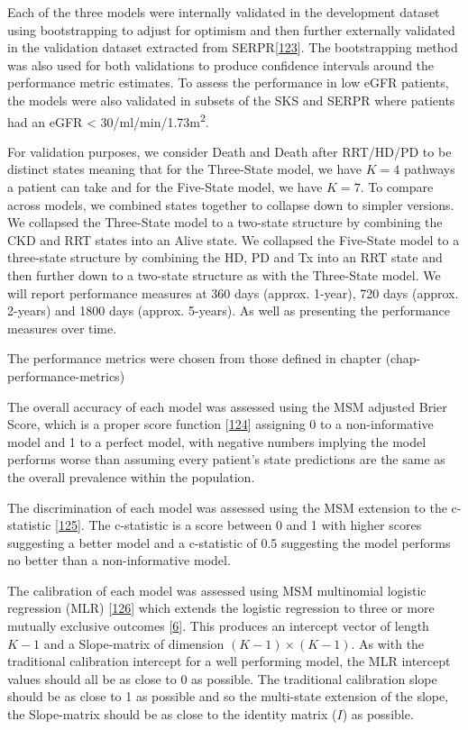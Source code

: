 \documentclass[12pt,PhD,twoside,openright]{muthesis}
\begin{document}
Each of the three models were internally validated in the development dataset using bootstrapping to adjust for optimism and then further externally validated in the validation dataset extracted from SERPR{[}\protect\hyperlink{ref-schomaker_bootstrap_2018}{123}{]}. The bootstrapping method was also used for both validations to produce confidence intervals around the performance metric estimates. To assess the performance in low eGFR patients, the models were also validated in subsets of the SKS and SERPR where patients had an eGFR \textless{} 30/ml/min/1.73m\textsuperscript{2}.

For validation purposes, we consider Death and Death after RRT/HD/PD to be distinct states meaning that for the Three-State model, we have \(K=4\) pathways a patient can take and for the Five-State model, we have \(K=7\). To compare across models, we combined states together to collapse down to simpler versions. We collapsed the Three-State model to a two-state structure by combining the CKD and RRT states into an Alive state. We collapsed the Five-State model to a three-state structure by combining the HD, PD and Tx into an RRT state and then further down to a two-state structure as with the Three-State model. We will report performance measures at 360 days (approx. 1-year), 720 days (approx. 2-years) and 1800 days (approx. 5-years). As well as presenting the performance measures over time.

The performance metrics were chosen from those defined in chapter (chap-performance-metrics)

The overall accuracy of each model was assessed using the MSM adjusted Brier Score, which is a proper score function {[}\protect\hyperlink{ref-gneiting_strictly_2007}{124}{]} assigning 0 to a non-informative model and 1 to a perfect model, with negative numbers implying the model performs worse than assuming every patient's state predictions are the same as the overall prevalence within the population.

The discrimination of each model was assessed using the MSM extension to the c-statistic {[}\protect\hyperlink{ref-calster_extending_2012-1}{125}{]}. The c-statistic is a score between 0 and 1 with higher scores suggesting a better model and a c-statistic of 0.5 suggesting the model performs no better than a non-informative model.

The calibration of each model was assessed using MSM multinomial logistic regression (MLR) {[}\protect\hyperlink{ref-hoorde_assessing_2014}{126}{]} which extends the logistic regression to three or more mutually exclusive outcomes {[}\protect\hyperlink{ref-riley_prognosis_2019}{6}{]}. This produces an intercept vector of length \(K-1\) and a Slope-matrix of dimension \((K-1) \times (K-1)\). As with the traditional calibration intercept for a well performing model, the MLR intercept values should all be as close to 0 as possible. The traditional calibration slope should be as close to 1 as possible and so the multi-state extension of the slope, the Slope-matrix should be as close to the identity matrix (\(I\)) as possible.
\end{document}

